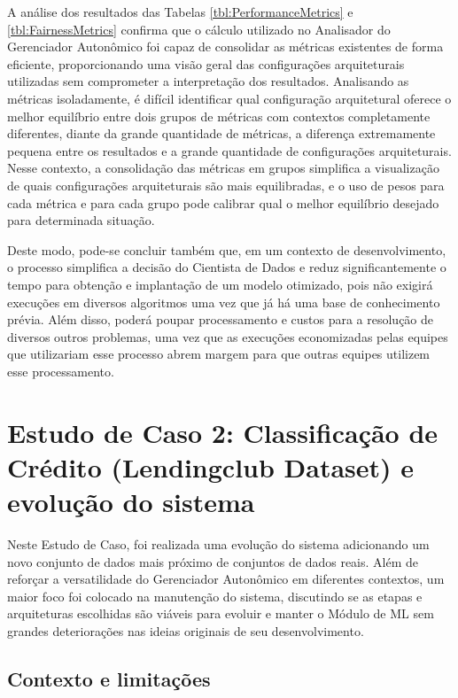 \documentclass[portugues]{ic-tese}
\begin{document}
A análise dos resultados das Tabelas \ref{tbl:PerformanceMetrics} e \ref{tbl:FairnessMetrics} confirma que o cálculo utilizado no Analisador do Gerenciador Autonômico foi capaz de consolidar as métricas existentes de forma eficiente, proporcionando uma visão geral das configurações arquiteturais utilizadas sem comprometer a interpretação dos resultados. Analisando as métricas isoladamente, é difícil identificar qual configuração arquitetural oferece o melhor equilíbrio entre dois grupos de métricas com contextos completamente diferentes, diante da grande quantidade de métricas, a diferença extremamente pequena entre os resultados e a grande quantidade de configurações arquiteturais. Nesse contexto, a consolidação das métricas em grupos simplifica a visualização de quais configurações arquiteturais são mais equilibradas, e o uso de pesos para cada métrica e para cada grupo pode calibrar qual o melhor equilíbrio desejado para determinada situação.

Deste modo, pode-se concluir também que, em um contexto de desenvolvimento, o processo simplifica a decisão do Cientista de Dados e reduz significantemente o tempo para obtenção e implantação de um modelo otimizado, pois não exigirá execuções em diversos algoritmos uma vez que já há uma base de conhecimento prévia. Além disso, poderá poupar processamento e custos para a resolução de diversos outros problemas, uma vez que as execuções economizadas pelas equipes que utilizariam esse processo abrem margem para que outras equipes utilizem esse processamento.

\chapter{Estudo de Caso 2: Classificação de Crédito (Lendingclub Dataset) e evolução do sistema}

Neste Estudo de Caso, foi realizada uma evolução do sistema adicionando um novo conjunto de dados mais próximo de conjuntos de dados reais. Além de reforçar a versatilidade do Gerenciador Autonômico em diferentes contextos, um maior foco foi colocado na manutenção do sistema, discutindo se as etapas e arquiteturas escolhidas são viáveis para evoluir e manter o Módulo de ML sem grandes deteriorações nas ideias originais de seu desenvolvimento.

\section{Contexto e limitações}
\end{document}
